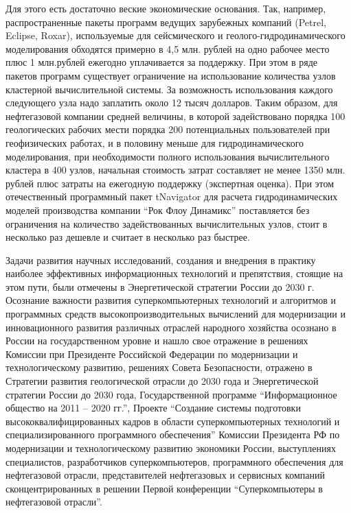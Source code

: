 Для этого есть достаточно веские экономические основания.
Так, например, распространенные пакеты программ ведущих зарубежных компаний (Petrel, Eclipse, Roxar), используемые для сейсмического и геолого-гидродинамического моделирования обходятся примерно в 4,5 млн. рублей на одно рабочее место плюс 1 млн.рублей ежегодно уплачивается за поддержку.
При этом в ряде пакетов программ существует ограничение на использование количества узлов кластерной вычислительной системы.
За возможность использования каждого следующего узла надо заплатить около 12 тысяч долларов.
Таким образом, для нефтегазовой компании средней величины, в которой задействовано порядка 100 геологических рабочих мести порядка 200 потенциальных пользователей при геофизических работах, и в половину меньше для гидродинамического моделирования, при необходимости полного использования вычислительного кластера в 400 узлов, начальная стоимость затрат составляет не менее 1350 млн. рублей плюс затраты на ежегодную поддержку (экспертная оценка).
При этом отечественный программный пакет tNavigator для расчета гидродинамических моделей производства компании ``Рок Флоу Динамикс'' поставляется без ограничения на количество задействованных вычислительных узлов, стоит в несколько раз дешевле и считает в несколько раз быстрее.

Задачи развития научных исследований, создания и внедрения в практику наиболее эффективных информационных технологий и препятствия, стоящие на этом пути, были отмечены в Энергетической стратегии России до 2030 г.
Осознание важности развития суперкомпьютерных технологий и алгоритмов и программных средств высокопроизводительных вычислений для модернизации и инновационного развития различных отраслей народного хозяйства осознано в России на государственном уровне и нашло свое отражение в решениях Комиссии при Президенте Российской Федерации по модернизации и технологическому развитию, решениях Совета Безопасности, отражено в Стратегии развития геологической отрасли до 2030 года и Энергетической стратегии России до 2030 года, Государственной программе ``Информационное общество на 2011 -- 2020 гг.'', Проекте ``Создание системы подготовки высококвалифицированных кадров в области суперкомпьютерных технологий и специализированного программного обеспечения'' Комиссии Президента РФ по модернизации и технологическому развитию экономики России, выступлениях специалистов, разработчиков суперкомпьютеров, программного обеспечения для нефтегазовой отрасли, представителей нефтегазовых и сервисных компаний сконцентрированных в решении Первой конференции ``Суперкомпьютеры в нефтегазовой отрасли''.

